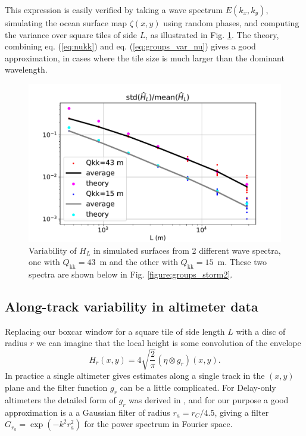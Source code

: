 {This expression is easily verified by taking a wave spectrum $E(k_x,k_y)$, simulating the ocean surface map $\zeta(x,y)$ using random phases, and computing the variance over square tiles of side $L$, as illustrated in Fig. \ref{fig:groups_maps}. The theory, combining eq. (\ref{eq:nukk}) and eq. (\ref{eq:groups_var_nu}) gives a good approximation, in cases where the tile size is much larger than the dominant wavelength. 
\begin{figure}[htb]
\centerline{\includegraphics[width=\textwidth]{FIGS_CH_GROUPS/std_maps.pdf}}
  \caption{Variability of $H_L$ in simulated surfaces from 2 different wave spectra, one with $Q_{\mathrm{kk}}=43$~m and the other with $Q_{\mathrm{kk}}=15$~m. These two spectra are shown below in Fig. \ref{figure:groups_storm2}.}
\label{fig:groups_maps}
\end{figure}


\subsection{Along-track variability in altimeter data}
Replacing our boxcar window for a square tile of side length $L$ with a disc of radius $r$ we can imagine that the local height is some convolution of the envelope
\begin{equation}
    H_{r}(x,y) = 4\sqrt{\frac{2}{\pi}} (\eta \otimes g_{r})(x,y).
   \label{eq:relation_Hs_eta}
\end{equation}
In practice a single altimeter gives estimates along a single track in the $(x,y)$ plane and the filter function $g_r$ can be a little complicated. For Delay-only altimeters the detailed form of $g_r$ was derived in \cite{DeCarlo&al.2023}, and for our purpose a good approximation is a a Gaussian filter of radius $r_a=r_C/4.5$, giving a filter $G_{r_a}=\exp{(-k^2 r_a^2)}$ for the power spectrum in Fourier space.  

}

